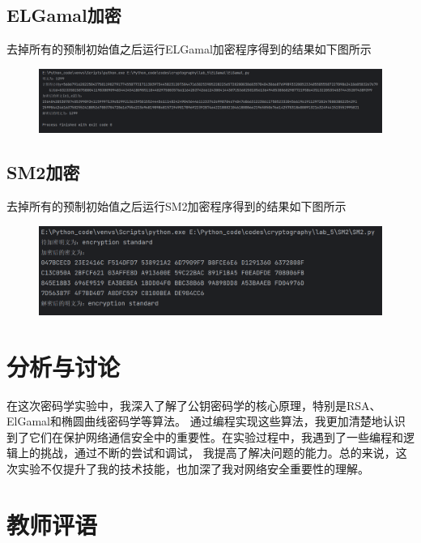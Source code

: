 \documentclass[a4paper,11pt,UTF8]{ctexart}
\newcommand{\bottomcaption}{%
\setlength{\abovecaptionskip}{6pt}%
\setlength{\belowcaptionskip}{6pt}%
\caption}
\newcommand{\xiaowuhao}{\fontsize{9pt}{\baselineskip}\selectfont}   %
\begin{document}
    \subsection{ELGamal加密}
        去掉所有的预制初始值之后运行ELGamal加密程序得到的结果如下图所示
        \begin{figure}[H]
            \centering
            \includegraphics[width=13cm]{ELG_result.png}
            \bottomcaption{\xiaowuhao{ELGamal加解密结果}}
        \end{figure}

    \subsection{SM2加密}
        去掉所有的预制初始值之后运行SM2加密程序得到的结果如下图所示
        \begin{figure}[H]
            \centering
            \includegraphics[width=13cm]{SM2_result.png}
            \bottomcaption{\xiaowuhao{SM2加解密结果}}
        \end{figure}


\section{分析与讨论}
    在这次密码学实验中，我深入了解了公钥密码学的核心原理，特别是RSA、ElGamal和椭圆曲线密码学等算法。
    通过编程实现这些算法，我更加清楚地认识到了它们在保护网络通信安全中的重要性。在实验过程中，我遇到了一些编程和逻辑上的挑战，通过不断的尝试和调试，
    我提高了解决问题的能力。总的来说，这次实验不仅提升了我的技术技能，也加深了我对网络安全重要性的理解。


\section{教师评语}
\end{document}
